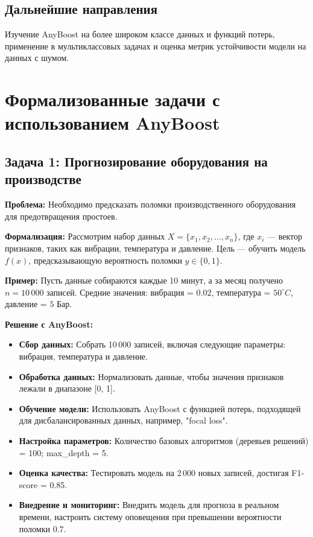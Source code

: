 \subsection*{Дальнейшие направления}
Изучение AnyBoost на более широком классе данных и функций потерь, применение в мультиклассовых задачах и оценка метрик устойчивости модели на данных с шумом.


\section*{Формализованные задачи с использованием AnyBoost}

\subsection*{Задача 1: Прогнозирование оборудования на производстве}

\textbf{Проблема:} Необходимо предсказать поломки производственного оборудования для предотвращения простоев.

\textbf{Формализация:}
Рассмотрим набор данных $X = \{x_1, x_2, \ldots, x_n\}$, где $x_i$ — вектор признаков, таких как вибрации, температура и давление. Цель — обучить модель $f(x)$, предсказывающую вероятность поломки $y \in \{0, 1\}$.

\textbf{Пример:}
Пусть данные собираются каждые 10 минут, а за месяц получено $n = 10\,000$ записей. Средние значения: вибрация = $0.02$, температура = $50^\circ C$, давление = $5$ Бар.

\textbf{Решение с AnyBoost:}
\begin{itemize}
    \item \textbf{Сбор данных:} Собрать 10\,000 записей, включая следующие параметры: вибрация, температура и давление.
    \item \textbf{Обработка данных:} Нормализовать данные, чтобы значения признаков лежали в диапазоне [0, 1].
    \item \textbf{Обучение модели:} Использовать AnyBoost с функцией потерь, подходящей для дисбалансированных данных, например, "focal loss".
    \item \textbf{Настройка параметров:} Количество базовых алгоритмов (деревьев решений) = 100; max\_depth = 5.
    \item \textbf{Оценка качества:} Тестировать модель на 2\,000 новых записей, достигая F1-score = 0.85.
    \item \textbf{Внедрение и мониторинг:} Внедрить модель для прогноза в реальном времени, настроить систему оповещения при превышении вероятности поломки 0.7.
\end{itemize}

